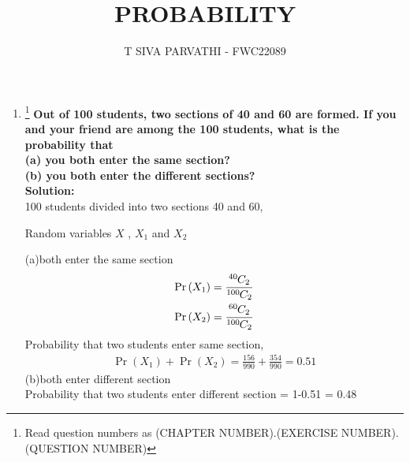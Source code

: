 \documentclass{article}
\providecommand{\pr}[1]{\ensuremath{\Pr\left(#1\right)}}
\newcommand{\solution}{\noindent \textbf{Solution: }}
\newcommand*{\permcomb}[4][0mu]{{{}^{#3}\mkern#1#2_{#4}}}
\newcommand*{\comb}[1][-1mu]{\permcomb[#1]{C}}
\begin{document}
\title{PROBABILITY}
\author{\Large T SIVA PARVATHI - FWC22089}
\date{}

\maketitle
\begin{enumerate}[label=16.\arabic{enumi}.\arabic{enumii}]%
\setcounter{enumi}{3}
\setcounter{enumii}{5}

\item \footnote{Read question numbers as (CHAPTER NUMBER).(EXERCISE NUMBER).(QUESTION NUMBER)}
\textbf {Out of 100 students, two sections of 40 and 60 are formed. If you and your friend are among the 100 students, what is the probability that\\(a) you both enter the same section?\\(b) you both enter the different sections?}\\[1ex]

\solution\\
100 students divided into two sections 40 and 60,
\begin{table}[h]
	
	 \caption{Random variables $X$ , $X_1$ and $X_2$}\label{table:1}
\end{table}

(a)both enter the same section\\
\begin{align*}
\pr{X_1} = \frac{\comb{40}{2}} {\comb{100}{2}}\\
\pr{X_2} = \frac{\comb{60}{2}} {\comb{100}{2}}
\end{align*}
Probability that two students enter same section,\\
\begin{align*}
\pr{X_1}+\pr{X_2} = \frac{156}{990}+\frac{354}{990} = 0.51
\end{align*}
(b)both enter different section\\
Probability that two students enter different section = 1-0.51 = 0.48
\end{enumerate}
\end{document}
